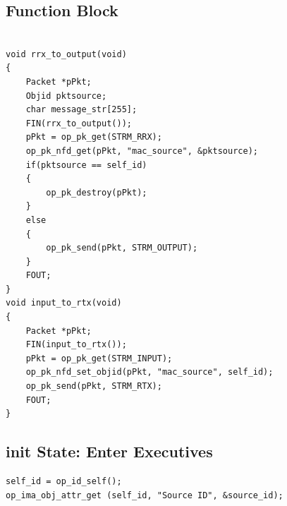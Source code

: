 \subsection{Function Block}
{\tiny
\begin{verbatim}

void rrx_to_output(void)
{
	Packet *pPkt;
	Objid pktsource;
	char message_str[255];
	FIN(rrx_to_output());
	pPkt = op_pk_get(STRM_RRX);
	op_pk_nfd_get(pPkt, "mac_source", &pktsource);
	if(pktsource == self_id)
	{		
		op_pk_destroy(pPkt);
	}
	else
	{
		op_pk_send(pPkt, STRM_OUTPUT);
	}
	FOUT;
}
void input_to_rtx(void)
{
	Packet *pPkt;
	FIN(input_to_rtx());
	pPkt = op_pk_get(STRM_INPUT);
	op_pk_nfd_set_objid(pPkt, "mac_source", self_id);
	op_pk_send(pPkt, STRM_RTX);
	FOUT;
}

\end{verbatim}
}

\subsection{init State: Enter Executives}
{\tiny
\begin{verbatim}
self_id = op_id_self();
op_ima_obj_attr_get (self_id, "Source ID", &source_id);

\end{verbatim}
}
